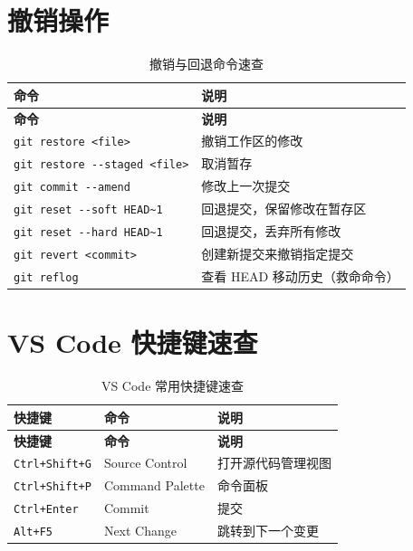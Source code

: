 \documentclass[12pt,a4paper,openany]{ctexbook}
\begin{document}
\section{撤销操作}

\begin{longtable}{p{5.5cm} p{9cm}}
\caption{撤销与回退命令速查}\label{tab:cmd-undo}\\
\toprule
\textbf{命令} & \textbf{说明} \\
\midrule
\endfirsthead
\toprule
\textbf{命令} & \textbf{说明} \\
\midrule
\endhead
\texttt{git restore <file>} & 撤销工作区的修改 \\
\texttt{git restore -\/-staged <file>} & 取消暂存 \\
\texttt{git commit -\/-amend} & 修改上一次提交 \\
\texttt{git reset -\/-soft HEAD\textasciitilde 1} & 回退提交，保留修改在暂存区 \\
\texttt{git reset -\/-hard HEAD\textasciitilde 1} & 回退提交，丢弃所有修改 \\
\texttt{git revert <commit>} & 创建新提交来撤销指定提交 \\
\texttt{git reflog} & 查看 HEAD 移动历史（救命命令） \\
\bottomrule
\end{longtable}

\section{VS Code 快捷键速查}

\begin{longtable}{p{4cm} p{5cm} p{5.5cm}}
\caption{VS Code 常用快捷键速查}\label{tab:vscode-shortcuts}\\
\toprule
\textbf{快捷键} & \textbf{命令} & \textbf{说明} \\
\midrule
\endfirsthead
\toprule
\textbf{快捷键} & \textbf{命令} & \textbf{说明} \\
\midrule
\endhead
\texttt{Ctrl+Shift+G} & Source Control & 打开源代码管理视图 \\
\texttt{Ctrl+Shift+P} & Command Palette & 命令面板 \\
\texttt{Ctrl+Enter} & Commit & 提交 \\
\texttt{Alt+F5} & Next Change & 跳转到下一个变更 \\
\bottomrule
\end{longtable}

\vspace{1cm}
\end{document}
